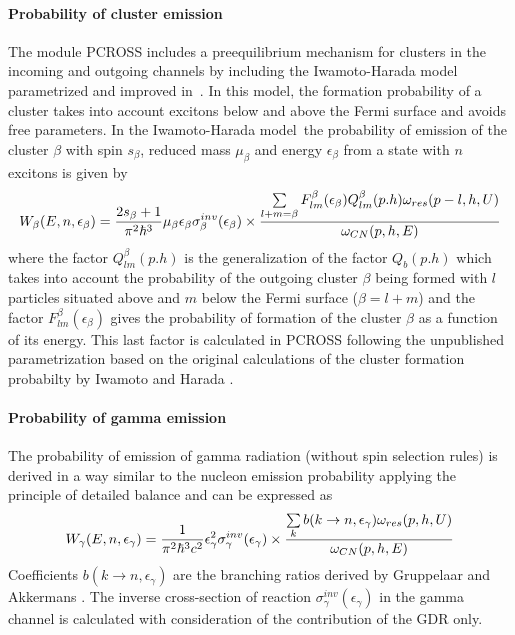 \paragraph{Probability of cluster emission}

The module PCROSS includes a preequilibrium mechanism for clusters in the
incoming and outgoing channels by including the Iwamoto-Harada model~\cite%
{iwha82} parametrized and improved in~\cite{saiwha83,za88,za89}. In this
model, the formation probability of a cluster takes into account excitons
below and above the Fermi surface and avoids free parameters. In the
Iwamoto-Harada model~the probability of emission of the cluster $\beta $
with spin $s_{\beta }$, reduced mass $\mu _{\beta }$ and energy $\epsilon
_{\beta }$ from a state with $n$ excitons is given by%
\begin{equation}
W_{\beta }(E,n,\epsilon _{\beta })=\frac{2s_{\beta }+1}{\pi ^{2}\hbar ^{3}}%
\mu _{\beta }\epsilon _{\beta }\sigma _{\beta }^{inv}(\epsilon _{\beta
})\times   \notag \\
\frac{\sum\limits_{l+m=\beta }F_{lm}^{\beta }(\epsilon _{\beta
})Q_{lm}^{\beta }(p.h)\omega _{res}(p-l,h,U)}{\omega _{CN}(p,h,E)}
\end{equation}%
where the factor $Q_{lm}^{\beta }(p.h)$ is the generalization of the factor $%
Q_{b}(p.h)$ which takes into account the probability of the outgoing cluster
$\beta $ being formed with $l$ particles situated above and $m$ below the
Fermi surface ($\beta =l+m$) \cite{za89} and the factor $F_{lm}^{\beta
}(\epsilon _{\beta })$ gives the probability of formation of the cluster $%
\beta $ as a function of its energy. This last factor is calculated in
PCROSS following the unpublished parametrization based on the original
calculations of the cluster formation probabilty by Iwamoto and Harada \cite%
{iwha82}.

\paragraph{Probability of gamma emission}

The probability of emission of gamma radiation (without spin selection
rules) is derived in a way similar to the nucleon emission probability
applying the principle of detailed balance \cite{plpr78,bedo79,akgr85} and
can be expressed as%
\begin{equation}
W_{\gamma }(E,n,\epsilon _{\gamma })=\frac{1}{\pi ^{2}\hbar ^{3}c^{2}}%
\epsilon _{\gamma }^{2}\sigma _{\gamma }^{inv}(\epsilon _{\gamma })\times
\notag \\
\frac{\sum\limits_{k}b(k\rightarrow n,\epsilon _{\gamma })\omega
_{res}(p,h,U)}{\omega _{CN}(p,h,E)}
\end{equation}%
Coefficients $b(k\rightarrow n,\epsilon _{\gamma })$ are the branching
ratios derived by Gruppelaar and Akkermans \cite{akgr85}. The inverse
cross-section of reaction $\sigma _{\gamma }^{inv}(\epsilon _{\gamma })$ in
the gamma channel is calculated with consideration of the contribution of
the GDR only.

